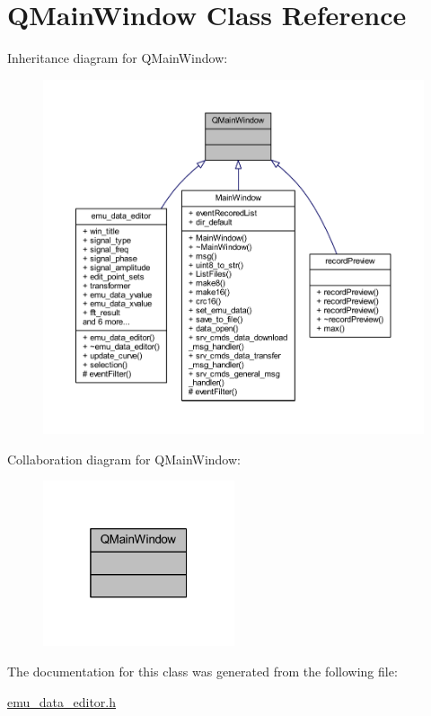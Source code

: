 \hypertarget{a00058}{\section{Q\+Main\+Window Class Reference}
\label{a00058}
}


Inheritance diagram for Q\+Main\+Window\+:
\nopagebreak
\begin{figure}[H]
\begin{center}
\leavevmode
\includegraphics[width=350pt]{d4/d33/a00536}
\end{center}
\end{figure}


Collaboration diagram for Q\+Main\+Window\+:
\nopagebreak
\begin{figure}[H]
\begin{center}
\leavevmode
\includegraphics[width=160pt]{d8/d6e/a00537}
\end{center}
\end{figure}


The documentation for this class was generated from the following file\+:\begin{DoxyCompactItemize}
\item 
\hyperlink{a00094}{emu\+\_\+data\+\_\+editor.\+h}\end{DoxyCompactItemize}
